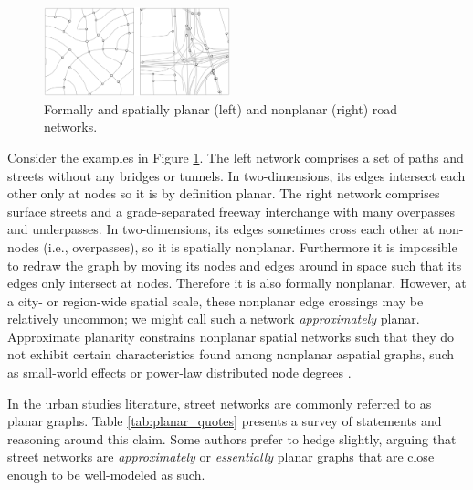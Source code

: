 \documentclass[Afour,sageh,times]{sagej}
\begin{document}
\begin{figure}[tbp]
	\center
	\includegraphics[width=0.48\textwidth]{planar_vs_not.png}
	\caption{Formally and spatially planar (left) and nonplanar (right) road networks.}
	\label{fig:planar_vs_not}
\end{figure}

Consider the examples in Figure \ref{fig:planar_vs_not}. The left network comprises a set of paths and streets without any bridges or tunnels. In two-dimensions, its edges intersect each other only at nodes so it is by definition planar. The right network comprises surface streets and a grade-separated freeway interchange with many overpasses and underpasses. In two-dimensions, its edges sometimes cross each other at non-nodes (i.e., overpasses), so it is spatially nonplanar. Furthermore it is impossible to redraw the graph by moving its nodes and edges around in space such that its edges only intersect at nodes. Therefore it is also formally nonplanar. However, at a city- or region-wide spatial scale, these nonplanar edge crossings may be relatively uncommon; we might call such a network \emph{approximately} planar. Approximate planarity constrains nonplanar spatial networks such that they do not exhibit certain characteristics found among nonplanar aspatial graphs, such as small-world effects or power-law distributed node degrees \citep{crucitti_centrality_2006,fischer_spatial_2014}.

In the urban studies literature, street networks are commonly referred to as planar graphs. Table \ref{tab:planar_quotes} presents a survey of statements and reasoning around this claim. Some authors prefer to hedge slightly, arguing that street networks are \emph{approximately} or \emph{essentially} planar graphs that are close enough to be well-modeled as such.
\end{document}
